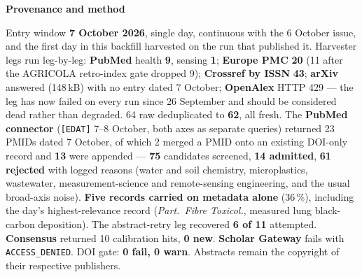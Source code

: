 \documentclass[10pt]{article}
\begin{document}


\vspace{2mm}

\begin{keybox}
{\sffamily\bfseries\footnotesize\color{Deep}Provenance and method}\\[1.2mm]
{\fontsize{7.2}{8.8}\selectfont
Entry window \textbf{7 October 2026}, single day, continuous with the 6 October issue, and the
first day in this backfill harvested on the run that published it. Harvester legs run leg-by-leg:
\textbf{PubMed} health \textbf{9}, sensing \textbf{1}; \textbf{Europe PMC} \textbf{20} (11 after the
AGRICOLA retro-index gate dropped 9); \textbf{Crossref by ISSN} \textbf{43}; \textbf{arXiv} answered
(148\,kB) with no entry dated 7 October; \textbf{OpenAlex} HTTP 429 --- the leg has now failed on every run
since 26 September and should be considered dead rather than degraded. 64 raw deduplicated to \textbf{62},
all fresh. The \textbf{PubMed connector} (\texttt{[EDAT]} 7--8 October, both axes as separate queries)
returned 23 PMIDs dated 7 October, of which 2 merged a PMID onto an existing DOI-only record and
\textbf{13} were appended --- \textbf{75} candidates screened, \textbf{14 admitted}, \textbf{61 rejected}
with logged reasons (water and soil chemistry, microplastics, wastewater, measurement-science and
remote-sensing engineering, and the usual broad-axis noise). \textbf{Five records carried on metadata
alone} (36\,\%), including the day's highest-relevance record (\textit{Part.\ Fibre Toxicol.}, measured
lung black-carbon deposition). The abstract-retry leg recovered \textbf{6 of 11} attempted.
\textbf{Consensus} returned 10 calibration hits, \textbf{0 new}. \textbf{Scholar Gateway} fails with
\texttt{ACCESS\_DENIED}. DOI gate: \textbf{0 fail, 0 warn}. Abstracts remain the copyright of their
respective publishers.\par}
\end{keybox}
\end{document}
